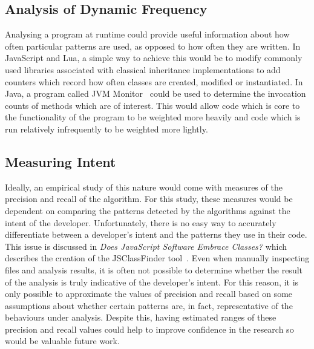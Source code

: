 \subsection{Analysis of Dynamic Frequency}
Analysing a program at runtime could provide useful information about how often particular patterns are used, as opposed to how often they are written. In JavaScript and Lua, a simple way to achieve this would be to modify commonly used libraries associated with classical inheritance implementations to add counters which record how often classes are created, modified or instantiated. In Java, a program called JVM Monitor~\cite{JVMMonitor} could be used to determine the invocation counts of methods which are of interest. This would allow code which is core to the functionality of the program to be weighted more heavily and code which is run relatively infrequently to be weighted more lightly.

\subsection{Measuring Intent}
Ideally, an empirical study of this nature would come with measures of the precision and recall of the algorithm. For this study, these measures would be dependent on comparing the patterns detected by the algorithms against the intent of the developer. Unfortunately, there is no easy way to accurately differentiate between a developer's intent and the patterns they use in their code. This issue is discussed in \textit{Does JavaScript Software Embrace Classes?} which describes the creation of the JSClassFinder tool~\cite{JSClassFinder}. Even when manually inspecting files and analysis results, it is often not possible to determine whether the result of the analysis is truly indicative of the developer's intent. For this reason, it is only possible to approximate the values of precision and recall based on some assumptions about whether certain patterns are, in fact, representative of the behaviours under analysis. Despite this, having estimated ranges of these precision and recall values could help to improve confidence in the research so would be valuable future work.